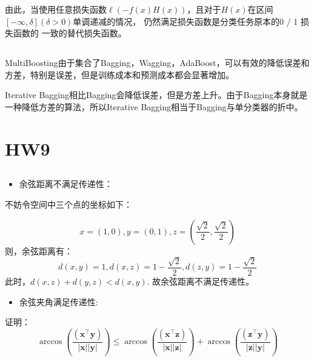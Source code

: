 \documentclass[UTF8,a4paper,AutoFakeBold,AutoFakeSlant]{article}
\begin{document}
由此，当使用任意损失函数$\ell(-f(x)H(x))$，且对于$H(x)$在区间$[-\infty,\delta](\delta>0)$单调递减的情况，
仍然满足损失函数是分类任务原本的0 / 1 损失函数的 一致的替代损失函数。



\subsection{}

MultiBoosting由于集合了Bagging，Wagging，AdaBoost，可以有效的降低误差和方差，特别是误差，但是训练成本和预测成本都会显著增加。

Iterative Bagging相比Bagging会降低误差，但是方差上升。由于Bagging本身就是一种降低方差的算法，所以Iterative Bagging相当于Bagging与单分类器的折中。






\section{HW9}

\subsection{}

\begin{itemize}
  \item 余弦距离不满足传递性：
\end{itemize}

不妨令空间中三个点的坐标如下：

$$ x = (1,0), y = (0,1), z = (\frac{\sqrt{2}}{2},\frac{\sqrt{2}}{2}) $$
则，余弦距离有：
$$ d(x,y) = 1, d(x,z) = 1-\frac{\sqrt{2}}{2}, d(z,y) = 1-\frac{\sqrt{2}}{2} $$
此时，$ d(x,z)+d(y,z) < d(x,y) $.
故余弦距离不满足传递性。

\begin{itemize}
  \item 余弦夹角满足传递性:
\end{itemize}

证明：$$ \arccos \left(\frac{\left(\boldsymbol{x}^{\top} \boldsymbol{y}\right)}{|\boldsymbol{x}||\boldsymbol{y}|}\right) \leq \arccos \left(\frac{\left(\boldsymbol{x}^{\top} \boldsymbol{z}\right)}{|\boldsymbol{x}||\boldsymbol{z}|}\right)+\arccos \left(\frac{\left(\boldsymbol{z}^{\top} \boldsymbol{y}\right)}{|\boldsymbol{z}||\boldsymbol{y}|}\right) $$
\end{document}
